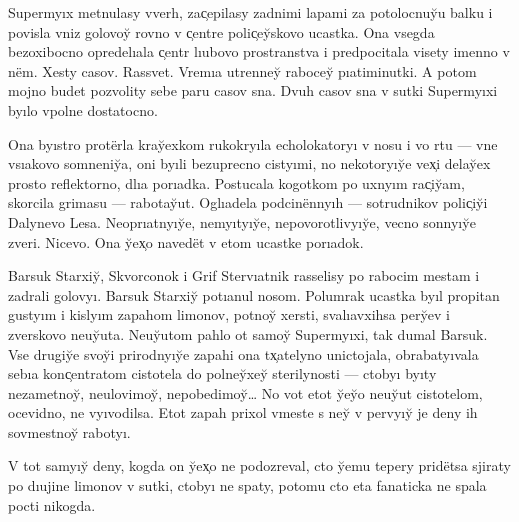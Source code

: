 \documentclass[12pt]{book}
\begin{document}
\newcommand{\X}{X̹}
\newcommand{\x}{x̹}
\newcommand{\C}{C̹}
\renewcommand{\c}{c̹}
\newcommand{\iopick}{u}

\newcommand{\e}{ë}
\newcommand{\yi}{\mbox{y\hspace{-0.55pt}ı}}
\newcommand{\ia}{\mbox{ı\hspace{-0.55pt}a}}
\newcommand{\io}{\mbox{ı\hspace{-0.55pt}\iopick}}
\newcommand{\y}{y̆}
\newcommand{\Y}{Y̆}

Superm{\yi}x metnulasy vverh, za{\c}epilasy zadnimi lapami za potolocnu{\y}u balku i povisla vniz go\-lo\-vo{\y} rovno v {\c}entre poli{\c}e{\y}skovo ucastka. Ona vsegda bez\-oxi\-boc\-no opredel{\ia}la {\c}entr l{\io}bovo prostranstva i predpocitala visety imenno v n{\e}m. Xesty casov. Rassvet. Vrem{\ia} utrenne{\y} raboce{\y} p{\ia}\-ti\-mi\-nut\-ki. A potom mojno budet pozvolity sebe paru casov sna. Dvuh casov sna v sutki Superm{\yi}xi b{\yi}lo vpolne dostatocno.

Ona b{\yi}stro prot{\e}rla kra{\y}exkom rukokr{\yi}la echolokator{\yi} v nosu i vo rtu — vne vs{\ia}kovo somneni{\y}a, oni b{\yi}li bezuprecno cist{\yi}mi, no nekotor{\yi}{\y}e ve{\x}i dela{\y}ex prosto reflektorno, dl{\ia} por{\ia}dka. Postucala kogotkom po uxn{\yi}m ra{\c}i{\y}am, skorcila grimasu — rabota{\y}ut. Ogl{\ia}dela podcin{\e}nn{\yi}h — sotrudnikov poli{\c}i{\y}i Dalynevo Lesa. Neopr{\ia}tn{\yi}{\y}e, nem{\yi}t{\yi}{\y}e, nepovorotliv{\yi}{\y}e, vecno sonn{\yi}{\y}e zveri. Nicevo. Ona {\y}e{\x}o naved{\e}t v etom ucastke por{\ia}dok.

Barsuk Starxi{\y}, Skvorconok i Grif Sterv{\ia}tnik rasselisy po rabocim mestam i zadrali golov{\yi}. Barsuk Starxi{\y} pot{\ia}nul nosom. Polumrak ucastka b{\yi}l propitan gust{\yi}m i kisl{\yi}m zapahom limonov, potno{\y} xersti, sval{\ia}vxihsa per{\y}ev i zverskovo neu{\y}uta. Neu{\y}utom pahlo ot samo{\y} Superm{\yi}xi, tak dumal Barsuk. Vse drugi{\y}e svo{\y}i prirodn{\yi}{\y}e zapahi ona t{\x}atelyno unictojala, obrabat{\yi}vala seb{\ia} kon{\c}entratom cistotela do polne{\y}xe{\y} sterilynosti — ctob{\yi} b{\yi}ty nezametno{\y}, neulovimo{\y}, nepobedimo{\y}… No vot etot {\y}e{\y}o neu{\y}ut cistotelom, ocevidno, ne v{\yi}vodilsa. Etot zapah prixol vmeste s ne{\y} v perv{\yi}{\y} je deny ih sovmestno{\y} rabot{\yi}.

V tot sam{\yi}{\y} deny, kogda on {\y}e{\x}o ne podozreval, cto {\y}emu tepery prid{\e}tsa sjiraty po d{\io}jine limonov v sutki, ctob{\yi} ne spaty, potomu cto eta fanaticka ne spala pocti nikogda.
\end{document}
